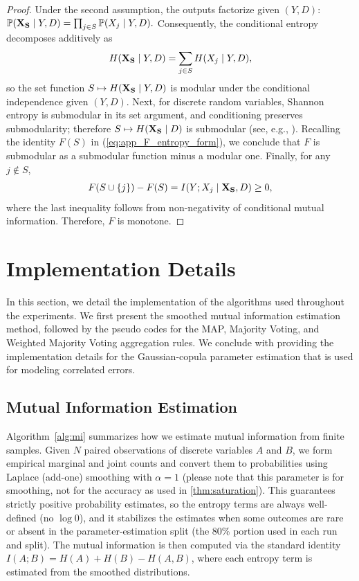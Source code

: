 \documentclass{article}
\theoremstyle{plain}
\theoremstyle{definition}
\theoremstyle{remark}
\begin{document}
\begin{proof}
Under the second assumption, the outputs factorize given $(Y,D)$:
\(
\mathbb{P}({\bf X_S}\mid Y,D)=\prod_{j\in S}\mathbb{P}(X_j\mid Y,D).
\)
Consequently, the conditional entropy decomposes additively as
\begin{equation}
\label{eq:app_modular_term}
H({\bf X_S}\mid Y,D)=\sum_{j\in S} H(X_j\mid Y,D),
\end{equation}
so the set function $S\mapsto H({\bf X_S}\mid Y,D)$ is modular under the conditional independence given $(Y,D)$. Next, for discrete random variables, Shannon entropy is submodular in its set argument, and conditioning preserves submodularity; therefore $S\mapsto H({\bf X_S}\mid D)$ is submodular (see, e.g., \citep{Cover2006}). Recalling the identity $F(S)$ in (\ref{eq:app_F_entropy_form}), we conclude that $F$ is submodular as a submodular function minus a modular one. Finally, for any $j\notin S$,
\begin{equation}
\label{eq:app_monotonicity}
F(S\cup\{j\})-F(S)=I(Y;X_j\mid {\bf X_S},D)\ge 0,
\end{equation}
where the last inequality follows from non-negativity of conditional mutual information. Therefore, $F$ is monotone.

\end{proof}

\newpage
\section{Implementation Details}
\label{app:implementation}
In this section, we detail the implementation of the algorithms used throughout the experiments. We first present the smoothed mutual information estimation method, followed by the pseudo codes for the MAP, Majority Voting, and Weighted Majority Voting aggregation rules. We conclude with providing the implementation details for the Gaussian-copula parameter estimation that is used for modeling correlated errors.

\subsection{Mutual Information Estimation}
Algorithm~\ref{alg:mi} summarizes how we estimate mutual information from finite samples. Given $N$ paired observations of discrete variables $A$ and $B$, we form empirical marginal and joint counts and convert them to probabilities using Laplace (add-one) smoothing with $\alpha=1$ (please note that this parameter is for smoothing, not for the accuracy as used in \cref{thm:saturation}). This guarantees strictly positive probability estimates, so the entropy terms are always well-defined (no $\log 0$), and it stabilizes the estimates when some outcomes are rare or absent in the parameter-estimation split (the 80\% portion used in each run and split). The mutual information is then computed via the standard identity $I(A; B) = H(A) + H(B) - H(A, B)$, where each entropy term is estimated from the smoothed distributions. 
\end{document}
